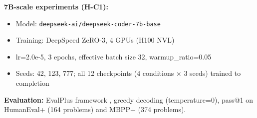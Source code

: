 \textbf{7B-scale experiments (H-C1):}
\begin{itemize}
\item Model: \texttt{deepseek-ai/deepseek-coder-7b-base}
\item Training: DeepSpeed ZeRO-3, 4 GPUs (H100 NVL)
\item lr=2.0e-5, 3 epochs, effective batch size 32, warmup\_ratio=0.05
\item Seeds: 42, 123, 777; all 12 checkpoints (4 conditions $\times$ 3 seeds) trained to completion
\end{itemize}

\textbf{Evaluation:} EvalPlus framework \citep{Liu2023EvalPlus}, greedy decoding (temperature=0), pass@1 on HumanEval+ (164 problems) and MBPP+ (374 problems).

